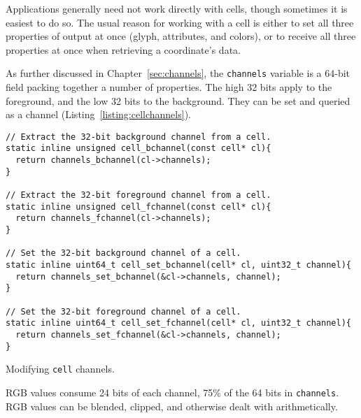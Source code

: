 Applications generally need not work directly with cells, though sometimes it
is easiest to do so. The usual reason for working with a cell is either to set
all three properties of output at once (glyph, attributes, and colors), or to
receive all three properties at once when retrieving a coordinate's data.

As further discussed in Chapter~\ref{sec:channels}, the \texttt{channels}
variable is a 64-bit field packing together a number of properties. The high
32 bits apply to the foreground, and the low 32 bits to the background. They
can be set and queried as a channel (Listing~\ref{listing:cellchannels}).

\begin{listing}[!htb]
\begin{verbatim}
// Extract the 32-bit background channel from a cell.
static inline unsigned cell_bchannel(const cell* cl){
  return channels_bchannel(cl->channels);
}

// Extract the 32-bit foreground channel from a cell.
static inline unsigned cell_fchannel(const cell* cl){
  return channels_fchannel(cl->channels);
}

// Set the 32-bit background channel of a cell.
static inline uint64_t cell_set_bchannel(cell* cl, uint32_t channel){
  return channels_set_bchannel(&cl->channels, channel);
}

// Set the 32-bit foreground channel of a cell.
static inline uint64_t cell_set_fchannel(cell* cl, uint32_t channel){
  return channels_set_fchannel(&cl->channels, channel);
}
\end{verbatim}
\caption{Modifying \texttt{cell} channels.}
\label{listing:cellchannels}
\end{listing}

RGB values consume 24 bits of each channel, 75\% of the 64 bits in \texttt{channels}.
RGB values can be blended, clipped, and otherwise dealt with arithmetically.

